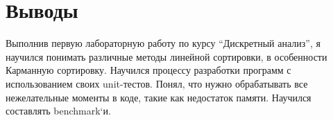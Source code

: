 \section{Выводы}


Выполнив первую лабораторную работу по курсу \enquote{Дискретный анализ}, я научился понимать различные методы линейной сортировки, в особенности Карманную сортировку. Научился процессу разработки программ с использованием своих unit-тестов. Понял, что нужно обрабатывать все нежелательные моменты в коде, такие как недостаток памяти. Научился составлять benchmark`и.
\pagebreak